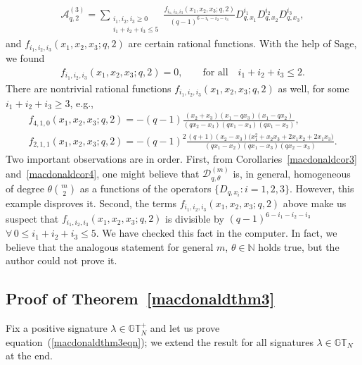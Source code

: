 \documentclass[pdftex]{sigma}
\numberwithin{equation}{section}
\newcommand{\N}{\mathbb{N}}
\newcommand{\AAA}{\mathcal{A}}
\newcommand{\GT}{\mathbb{GT}}
\newcommand{\GTp}{\mathbb{GT}^+}
\newcommand{\DD}{\mathcal{D}}
\begin{document}
\begin{exam}
\begin{gather*}
\AAA_{q, 2}^{(3)} = \sum_{\substack{ i_1, i_2, i_3\geq 0 \\ i_1 + i_2 + i_3 \leq 5}}{\frac{f_{i_1, i_2, i_3}(x_1, x_2, x_3; q, 2)}{(q - 1)^{6 - i_1 - i_2 - i_3}} D_{q, x_1}^{i_1}D_{q, x_2}^{i_2}D_{q, x_3}^{i_3}},
\end{gather*}
and $f_{i_1, i_2, i_3}(x_1, x_2, x_3; q, 2)$ are certain rational functions. With the help of Sage, we found
\begin{gather*}
f_{i_1, i_2, i_3}(x_1, x_2, x_3; q, 2) = 0, \qquad \textrm{for all} \quad i_1 + i_2 + i_3 \leq 2.
\end{gather*}
There are nontrivial rational functions $f_{i_1, i_2, i_3}(x_1, x_2, x_3; q, 2)$ as well, for some $i_1 + i_2 + i_3 \geq 3$, e.g.,
\begin{gather}
f_{4, 1, 0}(x_1, x_2, x_3; q, 2) = -(q - 1)\frac{(x_2 + x_3)(x_1 - qx_3)(x_1 - qx_2)}{(qx_2 - x_3)(qx_1 - x_3)(qx_1 - x_2)},\label{bmacdonald1}\\
f_{2, 1, 1}(x_1, x_2, x_3; q, 2) = -(q-1)^2\frac{(q+1)(x_2 - x_3)\big(x_1^2 + x_2x_3 + 2x_1x_2 + 2x_1x_3\big)}{(qx_1 - x_2)(qx_1 - x_3)(qx_2 - x_3)}.\label{bmacdonald2}
\end{gather}
Two important observations are in order. First, from Corollaries~\ref{macdonaldcor3} and~\ref{macdonaldcor4}, one might believe that $\DD_{q, \theta}^{(m)}$ is, in general, homogeneous of degree $\theta {m \choose 2}$ as a functions of the operators $\{D_{q, x_i} \colon i = 1, 2, 3\}$. However, this example disproves it. Second, the terms $f_{i_1, i_2, i_3}(x_1, x_2, x_3; q, 2)$ above make us suspect that $f_{i_1, i_2, i_3}(x_1, x_2, x_3; q, 2)$ is divisible by $(q- 1)^{6 - i_1 - i_2 - i_3}$ $\forall \, 0\leq i_1 + i_2 + i_3\leq 5$. We have checked this fact in the computer. In fact, we believe that the analogous statement for general $m$, $\theta \in \N$ holds true, but the author could not prove it.
\end{exam}

\subsection{Proof of Theorem~\ref{macdonaldthm3}}

Fix a positive signature $\lambda\in\GTp_N$ and let us prove equation~(\ref{macdonaldthm3eqn}); we extend the result for all signatures $\lambda\in\GT_N$ at the end.
\end{document}
